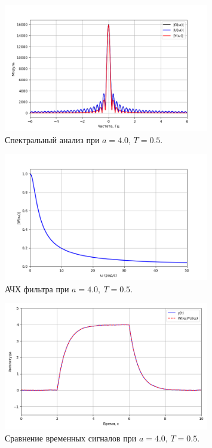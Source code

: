 \documentclass[a4paper]{article}
\begin{document}
\begin{figure}[H]
  \centering
  \includegraphics[width=0.8\textwidth]{src/task_1_1/spec_4.0_0.5.png}
  \caption{Спектральный анализ при \(a=4.0\), \(T=0.5\).}
\end{figure}

\begin{figure}[H]
  \centering
  \includegraphics[width=0.8\textwidth]{src/task_1_1/ach_4.0_0.5.png}
  \caption{АЧХ фильтра при \(a=4.0,\ T=0.5\).}
\end{figure}

\begin{figure}[H]
  \centering
  \includegraphics[width=0.8\textwidth]{src/task_1_1/time_comp_4.0_0.5.png}
  \caption{Сравнение временных сигналов при \(a=4.0\), \(T=0.5\).}
\end{figure}
\end{document}
